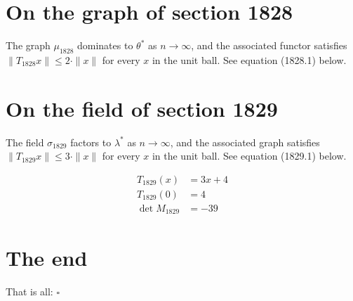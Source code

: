 \documentclass{article}
\begin{document}
\section{On the graph of section 1828}
The graph $\mu_{1828}$ dominates to $\theta^{*}$ as $n \to \infty$,
and the associated functor satisfies $\|T_{1828} x\| \leq 2 \cdot \|x\|$
for every $x$ in the unit ball. See equation (1828.1) below.

\section{On the field of section 1829}
The field $\sigma_{1829}$ factors to $\lambda^{*}$ as $n \to \infty$,
and the associated graph satisfies $\|T_{1829} x\| \leq 3 \cdot \|x\|$
for every $x$ in the unit ball. See equation (1829.1) below.

\begin{align}
T_{1829}(x) &= 3 x + 4 \\
T_{1829}(0) &= 4 \\
\det M_{1829} &= -39
\end{align}

\section{The end}
That is all: $\square$
\end{document}
